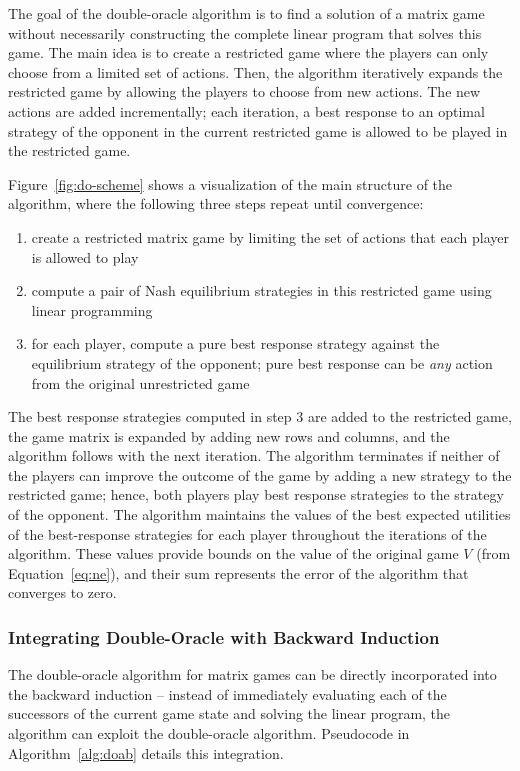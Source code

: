The goal of the double-oracle algorithm is to find a solution of a matrix game without necessarily constructing the complete linear program that solves this game.
The main idea is to create a restricted game where the players can only choose from a limited set of actions.
Then, the algorithm iteratively expands the restricted game by allowing the players to choose from new actions.
The new actions are added incrementally; each iteration, a best response to an optimal strategy of the opponent in the current restricted game is
allowed to be played in the restricted game.

Figure~\ref{fig:do-scheme} shows a visualization of the main structure of the algorithm, where the following three steps repeat until convergence:
\begin{enumerate}
\item create a restricted matrix game by limiting the set of actions that each player is allowed to play
\item compute a pair of Nash equilibrium strategies in this restricted game using linear programming
\item for each player, compute a pure best response strategy against the equilibrium strategy of the opponent; pure best response can be \emph{any} action from the original unrestricted game
\end{enumerate}
The best response strategies computed in step 3 are added to the restricted game, the game matrix is expanded by adding new rows and columns, and the algorithm follows with the next iteration. The algorithm terminates if neither of the players can improve the outcome of the game by adding a new strategy to the restricted game; hence, both players play best response strategies to the strategy of the opponent. The algorithm maintains the values of the best expected utilities of the best-response strategies for each player throughout the iterations of the algorithm. These values provide bounds on the value of the original game $V$ (from Equation~\ref{eq:ne}), and their sum represents the error of the algorithm that converges to zero.

\subsubsection{Integrating Double-Oracle with Backward Induction}

The double-oracle algorithm for matrix games can be directly incorporated into the backward induction -- instead of immediately evaluating each of the successors of the current game state and solving the linear program, the algorithm can exploit the double-oracle algorithm. Pseudocode in Algorithm~\ref{alg:doab} details this integration.

